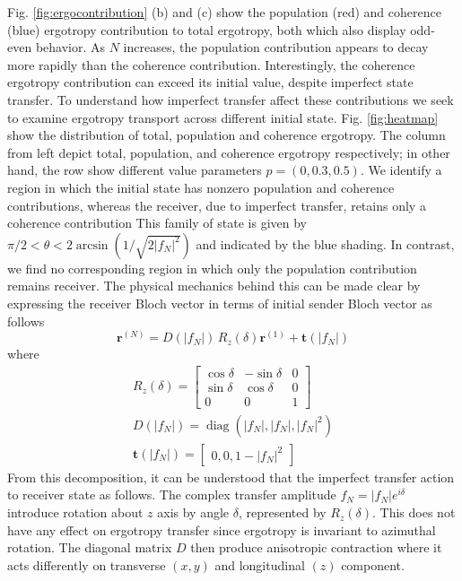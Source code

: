 \documentclass[../../../main.tex]{subfiles}
\begin{document}
Fig. \ref{fig:ergocontribution} (b) and (c) show the population (red) and coherence (blue) ergotropy contribution to total ergotropy, both which also display odd-even behavior.
As $N$ increases, the population contribution appears to decay more rapidly than the coherence contribution.
Interestingly, the coherence ergotropy contribution can exceed its initial value, despite imperfect state transfer.
To understand how imperfect transfer affect these contributions we seek to examine ergotropy transport across different initial state.
Fig. \ref{fig:heatmap} show the distribution of total, population and coherence ergotropy.
The column from left depict total, population, and coherence ergotropy respectively; in other hand, the row show different value parameters $p=(0,0.3,0.5)$.
We identify a region in which the initial state has nonzero population and coherence contributions, whereas the receiver, due to imperfect transfer, retains only a coherence contribution
This family of state is given by $\pi/2<\theta<2 \arcsin(1/\sqrt{2|f_N|^2})$ and indicated by the blue shading.
In contrast, we find no corresponding region in which only the population contribution remains receiver.
The physical mechanics behind this can be made clear by expressing the receiver Bloch vector in terms of initial sender Bloch vector as follows
\begin{equation*}
  \mathbf r^{(N)}  =  D(|f_N|)\,R_z(\delta) \mathbf r^{(1)} +\mathbf t(|f_N|)
\end{equation*}
where 
\begin{gather}
  R_z (\delta) =
  \begin{bmatrix}
    \cos\delta  & -\sin\delta & 0 \\
    \sin\delta & \cos\delta & 0 \\
    0           & 0          & 1
  \end{bmatrix}\\
  D(|f_N|) = \operatorname{diag}(|f_N|,|f_N|,|f_N|^2)\\
  \textbf{t} (|f_N|)= \begin{bmatrix} 0, 0,1-|f_N|^2 \end{bmatrix}
\end{gather}
From this decomposition, it can be understood that the imperfect transfer action to receiver state as follows. 
The complex transfer amplitude $f_N = |f_N|e^{i\delta}$ introduce rotation about $z$ axis by angle $\delta$, represented by $R_z(\delta)$.
This does not have any effect on ergotropy transfer since ergotropy is invariant to azimuthal rotation.
The diagonal matrix $D$ then produce anisotropic contraction where it acts differently on transverse $(x,y)$ and longitudinal $(z)$ component.
\end{document}
